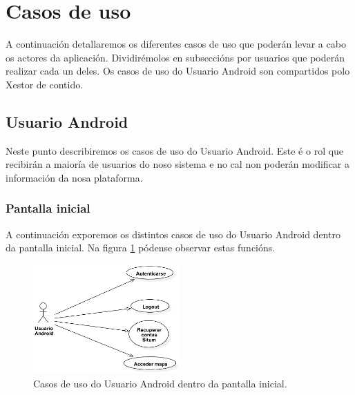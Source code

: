 \section{Casos de uso}

A continuación detallaremos os diferentes casos de uso que poderán levar a cabo os actores da aplicación. Dividirémolos en subseccións por usuarios que poderán realizar cada un deles. Os casos de uso do Usuario Android son compartidos polo Xestor de contido.

\subsection{Usuario Android}

Neste punto describiremos os casos de uso do Usuario Android. Este é o rol que recibirán a maioría de usuarios do noso sistema e no cal non poderán modificar a información da nosa plataforma.

\subsubsection{Pantalla inicial}
A continuación exporemos os distintos casos de uso do Usuario Android dentro da pantalla inicial. Na figura \ref{fig:cuUsuarioAndroidPantallaInicial} pódense observar estas funcións.

\begin{figure}[tbh] 
	\begin{center}
		\includegraphics[width=0.5\textwidth]{figures/CasosUso/UsuarioAndroidPantallaInicial}
		\caption{Casos de uso do Usuario Android dentro da pantalla inicial.}
		\label{fig:cuUsuarioAndroidPantallaInicial}
	\end{center}
\end{figure}

